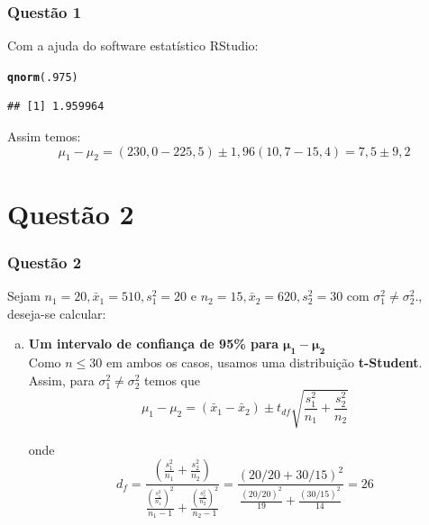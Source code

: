 \documentclass{beamer}\usepackage[]{graphicx}\usepackage[]{color}
\makeatletter
\newcommand{\hlnum}[1]{\textcolor[rgb]{0.686,0.059,0.569}{#1}}%
\newcommand{\hlstd}[1]{\textcolor[rgb]{0.345,0.345,0.345}{#1}}%
\newcommand{\hlkwd}[1]{\textcolor[rgb]{0.737,0.353,0.396}{\textbf{#1}}}%
\newenvironment{kframe}{%
 \def\at@end@of@kframe{}%
 \ifinner\ifhmode%
  \def\at@end@of@kframe{\end{minipage}}%
  \begin{minipage}{\columnwidth}%
 \fi\fi%
 \def\FrameCommand##1{\hskip\@totalleftmargin \hskip-\fboxsep
 \colorbox{shadecolor}{##1}\hskip-\fboxsep
     \hskip-\linewidth \hskip-\@totalleftmargin \hskip\columnwidth}%
 \MakeFramed {\advance\hsize-\width
   \@totalleftmargin\z@ \linewidth\hsize
   \@setminipage}}%
 {\par\unskip\endMakeFramed%
 \at@end@of@kframe}
\newenvironment{knitrout}{}{} %
\makeatother
\begin{document}
                \begin{frame}[fragile]
                        \frametitle{Questão 1}
                        Com a ajuda do software estatístico RStudio:
\begin{knitrout}
\color{fgcolor}\begin{kframe}
\begin{alltt}
\hlkwd{qnorm}\hlstd{(}\hlnum{.975}\hlstd{)}
\end{alltt}
\begin{verbatim}
## [1] 1.959964
\end{verbatim}
\end{kframe}
\end{knitrout}
                        Assim temos:
                        $$\mu_{1} - \mu_{2} = (230,0 - 225,5)\pm1,96(10,7-15,4) = 7,5\pm9,2$$

                \end{frame}
                
    \section{Questão 2}
    	\begin{frame}
    		\frametitle{Questão 2}
    		Sejam $n_{1} = 20, \bar{x}_{1} = 510, s^{2}_{1} = 20$ e $n_{2} = 15, \bar{x}_{2} = 620, s^{2}_{2} = 30$ com $\sigma_{1}^{2} \neq \sigma_{2}^{2}$., deseja-se calcular:\\
    		\begin{enumerate}[a)]
    			\item \textbf{{Um intervalo de confiança de 95\% para}} $\boldsymbol{\mu_{1} - \mu_{2}}$\\
    			
    			Como $n \leq 30$ em ambos os casos, usamos uma distribuição \textbf{t-Student}.  Assim, para $\sigma_{1}^{2} \neq \sigma_{2}^{2}$ temos que $$\mu_{1}-\mu_{2} = (\bar{x}_{1} - \bar{x}_{2}) \pm t_{df}\sqrt{\frac{s_{1}^{2}}{n_{1}}+\frac{s_{2}^{2}}{n_{2}}}$$
    			
    			onde $$d_{f} = \frac{(\frac{s_{1}^{2}}{n_{1}}+\frac{s_{2}^{2}}{n_{2}})}{\frac{(\frac{s_{1}^{2}}{n_{1}})^2}{n_{1}-1} + \frac{(\frac{s_{2}^{2}}{n_{2}})^2}{n_{2}-1}} = \frac{(20/20 + 30/15)^2}{\frac{(20/20)^2}{19}+\frac{(30/15)^2}{14}} = 26$$ 
    			
    		\end{enumerate}
    	\end{frame}
    	
\end{document}
